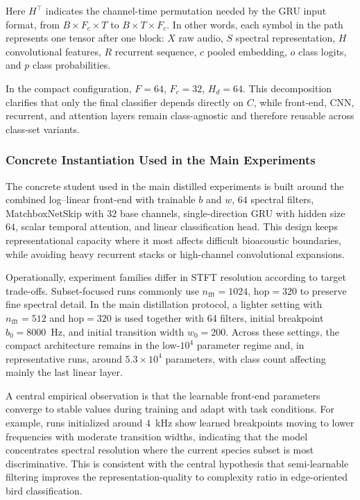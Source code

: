 \documentclass[a4paper,singleside,12pt]{report} %
\begin{document}
	Here \(H^{\top}\) indicates the channel-time permutation needed by the GRU input format, from \(B\times F_c\times T\) to \(B\times T\times F_c\). In other words, each symbol in the path represents one tensor after one block: \(X\) raw audio, \(S\) spectral representation, \(H\) convolutional features, \(R\) recurrent sequence, \(c\) pooled embedding, \(o\) class logits, and \(p\) class probabilities.

	In the compact configuration, \(F=64\), \(F_c=32\), \(H_d=64\). This decomposition clarifies that only the final classifier depends directly on \(C\), while front-end, CNN, recurrent, and attention layers remain class-agnostic and therefore reusable across class-set variants.

	\subsubsection{Concrete Instantiation Used in the Main Experiments}
	The concrete student used in the main distilled experiments is built around the combined log--linear front-end with trainable \(b\) and \(w\), \(64\) spectral filters, MatchboxNetSkip with \(32\) base channels, single-direction GRU with hidden size \(64\), scalar temporal attention, and linear classification head. This design keeps representational capacity where it most affects difficult bioacoustic boundaries, while avoiding heavy recurrent stacks or high-channel convolutional expansions.

	Operationally, experiment families differ in STFT resolution according to target trade-offs. Subset-focused runs commonly use \(n_{\mathrm{fft}}=1024\), \(\mathrm{hop}=320\) to preserve fine spectral detail. In the main distillation protocol, a lighter setting with \(n_{\mathrm{fft}}=512\) and \(\mathrm{hop}=320\) is used together with 64 filters, initial breakpoint \(b_0=8000\)~Hz, and initial transition width \(w_0=200\). Across these settings, the compact architecture remains in the low-\(10^4\) parameter regime and, in representative runs, around \(5.3\times10^4\) parameters, with class count affecting mainly the last linear layer.

	A central empirical observation is that the learnable front-end parameters converge to stable values during training and adapt with task conditions. For example, runs initialized around \(4\)~kHz show learned breakpoints moving to lower frequencies with moderate transition widths, indicating that the model concentrates spectral resolution where the current species subset is most discriminative. This is consistent with the central hypothesis that semi-learnable filtering improves the representation-quality to complexity ratio in edge-oriented bird classification.
\end{document}
